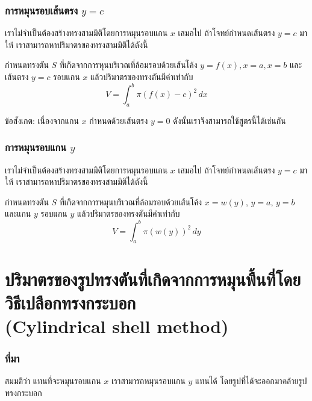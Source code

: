\begin{frame}
\frametitle{การหมุนรอบเส้นตรง $y=c$}
เราไม่จำเป็นต้องสร้างทรงสามมิติโดยการหมุนรอบแกน $x$ เสมอไป ถ้าโจทย์กำหนดเส้นตรง $y=c$ มาให้ เราสามารถหาปริมาตรของทรงสามมิติได้ดังนี้
\begin{thm}{}{}
กำหนดทรงตัน $S$ ที่เกิดจากการหุนบริเวณที่ล้อมรอบด้วยเส้นโค้ง $y = f(x), x = a, x = b$ และเส้นตรง $y=c$ รอบแกน $x$ แล้วปริมาตรของทรงตันมีค่าเท่ากับ
\begin{equation} \label{eq:int_applied_volume_disk_another_line}
V = \int_a^b \pi (f(x)-c)^2 \, dx 
\end{equation}
\end{thm}
ข้อสังเกต: เนื่องจากแกน $x$ กำหนดด้วยเส้นตรง $y=0$ ดังนั้นเราจึงสามารถใช้สูตรนี้ได้เช่นกัน
\end{frame}

\begin{frame}
\end{frame}

\begin{frame}
\frametitle{การหมุนรอบแกน $y$}
เราไม่จำเป็นต้องสร้างทรงสามมิติโดยการหมุนรอบแกน $x$ เสมอไป ถ้าโจทย์กำหนดเส้นตรง $y=c$ มาให้ เราสามารถหาปริมาตรของทรงสามมิติได้ดังนี้
\begin{thm}{}{}
กำหนดทรงตัน $S$ ที่เกิดจากการหมุนบริเวณที่ล้อมรอบด้วยเส้นโค้ง $x = w(y)$, $y = a$, $y = b$ และแกน $y$ รอบแกน $y$ แล้วปริมาตรของทรงตันมีค่าเท่ากับ
\begin{equation} \label{eq:int_applied_volume_disk_y}
V = \int_a^b \pi (w(y))^2 \, dy 
\end{equation}
\end{thm}
\end{frame}

\begin{frame}
\end{frame}

\section[หมุนพื้นที่โดยวิธีเปลือกทรงกระบอก]{ปริมาตรของรูปทรงตันที่เกิดจากการหมุนพื้นที่โดยวิธีเปลือกทรงกระบอก \\ (Cylindrical shell method)}
\frame{\sectionpage}

\begin{frame}
\frametitle{ที่มา}
สมมติว่า แทนที่จะหมุนรอบแกน $x$ เราสามารถหมุนรอบแกน $y$ แทนได้ โดยรูปที่ได้จะออกมาคล้ายรูปทรงกระบอก
\end{frame}

